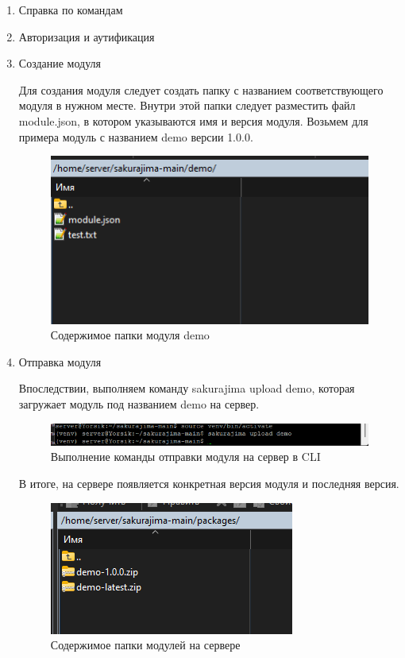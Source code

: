 \begin{enumerate}

\item Справка по командам


\item Авторизация и аутификация


\item Создание модуля

Для создания модуля следует создать папку с названием соответствующего модуля в нужном месте. Внутри этой папки следует разместить файл module.json, в котором указываются имя и версия модуля. Возьмем для примера модуль с названием demo версии 1.0.0.

\begin{figure}
  \centering
  \includegraphics[width=.6\textwidth]{graphics/test/demo_r.png}
  \caption{Содержимое папки модуля demo}
  \label{fig:test1}
\end{figure}
\newpage
    \item Отправка модуля

Впоследствии, выполняем команду sakurajima upload demo, которая загружает модуль под названием demo на сервер.

\begin{figure}
  \centering
  \includegraphics[width=1.0\textwidth]{graphics/test/demo.png}
  \caption{Выполнение команды отправки модуля на сервер в CLI}
  \label{fig:test1}
\end{figure}

В итоге, на сервере появляется конкретная версия модуля и последняя версия.

\begin{figure}
  \centering
  \includegraphics[width=.7\textwidth]{graphics/test/demo_alias_modules.png}
  \caption{Содержимое папки модулей на сервере}
  \label{fig:test1}
\end{figure}


\end{enumerate}
